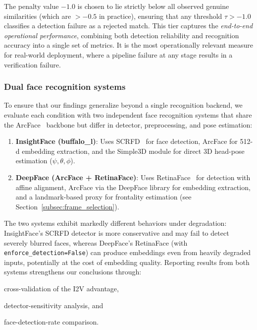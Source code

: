 The penalty value $-1.0$ is chosen to lie strictly below all
observed genuine similarities (which are $> -0.5$ in practice),
ensuring that any threshold $\tau > -1.0$ classifies a detection
failure as a rejected match. This tier captures the
\emph{end-to-end operational performance}, combining both detection
reliability and recognition accuracy into a single set of metrics.
It is the most operationally relevant measure for real-world
deployment, where a pipeline failure at any stage results in a
verification failure.

\subsubsection{Dual face recognition systems}
\label{subsubsec:dual_fr}

To ensure that our findings generalize beyond a single recognition
backend, we evaluate each condition with two independent face
recognition systems that share the ArcFace~\cite{ArcFace} backbone
but differ in detector, preprocessing, and pose estimation:

\begin{enumerate}
    \item \textbf{InsightFace (buffalo\_l)}: Uses
          SCRFD~\cite{SCRFD} for face detection, ArcFace for 512-d
          embedding extraction, and the Simple3D module for direct
          3D head-pose estimation ($\psi, \theta, \phi$).
    \item \textbf{DeepFace (ArcFace + RetinaFace)}: Uses
          RetinaFace~\cite{RetinaFace} for detection with affine
          alignment, ArcFace via the DeepFace library for embedding
          extraction, and a landmark-based proxy for frontality
          estimation (see Section~\ref{subsec:frame_selection}).
\end{enumerate}

The two systems exhibit markedly different behaviors under
degradation: InsightFace's SCRFD detector is more conservative
and may fail to detect severely blurred faces, whereas DeepFace's
RetinaFace (with \texttt{enforce\_detection=False}) can produce
embeddings even from heavily degraded inputs, potentially at the
cost of embedding quality. Reporting results from both systems
strengthens our conclusions through:
\begin{enumerate*}[label=(\roman*)]
    \item cross-validation of the I2V advantage,
    \item detector-sensitivity analysis, and
    \item face-detection-rate comparison.
\end{enumerate*}

